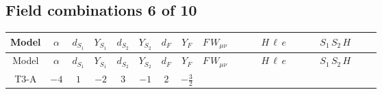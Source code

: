 \documentclass[8pt]{article}
\begin{document}
\begin{landscape}
\subsection*{Field combinations 6 of 10}
\begin{longtable}{@{}cccccccc >{\raggedright\arraybackslash}p{0.21\linewidth} >{\raggedright\arraybackslash}p{0.21\linewidth} >{\raggedright\arraybackslash}p{0.21\linewidth}@{}}
\toprule
Model & $\alpha$ & $d_{S_1}$ & $Y_{S_1}$ & $d_{S_2}$ & $Y_{S_2}$ & $d_F$ & $Y_F$ & $F\,W_{\mu\nu}$ & $H\,\ell\,e$ & $S_1\,S_2\,H$ \\
\midrule
\endfirsthead
\toprule
Model & $\alpha$ & $d_{S_1}$ & $Y_{S_1}$ & $d_{S_2}$ & $Y_{S_2}$ & $d_F$ & $Y_F$ & $F\,W_{\mu\nu}$ & $H\,\ell\,e$ & $S_1\,S_2\,H$ \\
\midrule
\endhead
T3-A & $-4$ & $1$ & $-2$ & $3$ & $-1$ & $2$ & $-\frac{3}{2}$ & \scriptsize\adjustbox{max width=\linewidth}{$\begin{gathered} -\frac{1}{2} \hbar  \log \left(\frac{\bar{\mu}^{2}}{M_F^2}\right) \left(W_{\mu _1\mu _2}^{A_1}\right){}^2\end{gathered}$} & \scriptsize\adjustbox{max width=\linewidth}{$\begin{gathered} +\frac{\hbar  \overline{y_{1,i_3,r_1}} \overline{L_{a_1,i_2}}\, P_R\, e_{i_1} H_{a_1} y_{1,i_2,r_1} Y_{e,i_3,i_1}}{4 \epsilon } \\ +\frac{3}{8} \hbar  \overline{y_{1,i_3,r_1}} \overline{L_{a_1,i_2}}\, P_R\, e_{i_1} H_{a_1} y_{1,i_2,r_1} Y_{e,i_3,i_1} \\ +\frac{\sqrt{3} \hbar  \overline{y_{2,i_3,r_1}} \overline{L_{a_1,i_2}}\, P_R\, e_{i_1} H_{a_1} y_{2,i_2,r_1} Y_{e,i_3,i_1}}{4 \epsilon }\end{gathered}$} & \scriptsize\adjustbox{max width=\linewidth}{$\begin{gathered} +\overline{\lambda_5} S_{2,j_1} {\mathcal{I}_{LLS_1S_2}}^{*}_{a_1,a_2,j_1} H_{a_1}{}^{\dagger } H_{a_2}{}^{\dagger } S_1{}^{\dagger } \\ -\frac{\hbar  \overline{y_{1,i_1,r_1}} \overline{\lambda_5} S_{2,j_1} y_{1,i_1,r_1} {\mathcal{I}_{LLS_1S_2}}^{*}_{a_1,a_2,j_1} H_{a_1}{}^{\dagger } H_{a_2}{}^{\dagger } S_1{}^{\dagger }}{\epsilon } \\ -\frac{1}{2} \hbar  \overline{y_{1,i_1,r_1}} \overline{\lambda_5} S_{2,j_1} y_{1,i_1,r_1} {\mathcal{I}_{LLS_1S_2}}^{*}_{a_1,a_2,j_1} H_{a_1}{}^{\dagger } H_{a_2}{}^{\dagger } S_1{}^{\dagger }\end{gathered}$} \\

\end{longtable}
\end{landscape}
\end{document}
